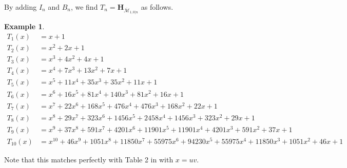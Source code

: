 \documentclass[11pt]{amsart}
\numberwithin{equation}{section}
\theoremstyle{definition}
\newtheorem{exam}[theo]{Example}
\newcommand{\bH}{\mathbf{H}}
\def\cM{{\mathcal M}}
\def\bcM{\overline{\cM}}
\begin{document}
\medskip 

By adding $I_n$ and $B_n$, we find $T_n=\bH_{\bcM_{1,0|n}}$ as follows. 
\begin{exam}\label{7}
\begin{align*}
T_1(x) &= x + 1 \\
T_2(x) &= x^2 + 2x + 1 \\
T_3(x) &= x^3 + 4x^2 + 4x + 1 \\
T_4(x) &= x^4 + 7x^3 + 13x^2 + 7x + 1 \\
T_5(x) &= x^5 + 11x^4 + 35x^3 + 35x^2 + 11x + 1 \\
T_6(x) &= x^6 + 16x^5 + 81x^4 + 140x^3 + 81x^2 + 16x + 1 \\
T_7(x) &= x^7 + 22x^6 + 168x^5 + 476x^4 + 476x^3 + 168x^2 + 22x + 1 \\
T_8(x) &= x^8 + 29x^7 + 323x^6 + 1456x^5 + 2458x^4 + 1456x^3 + 323x^2 + 29x + 1 \\
T_9(x) &= x^9 + 37x^8 + 591x^7 + 4201x^6 + 11901x^5 + 11901x^4 + 4201x^3 + 591x^2 + 37x + 1 \\
T_{10}(x) &= x^{10} + 46x^9 + 1051x^8 + 11850x^7 + 55975x^6 + 94230x^5 + 55975x^4 + 11850x^3 + 1051x^2 + 46x + 1
\end{align*}
\end{exam}
Note that this matches perfectly with Table 2 in \cite{KSY} with $x=uv$.

\medskip
\end{document}
